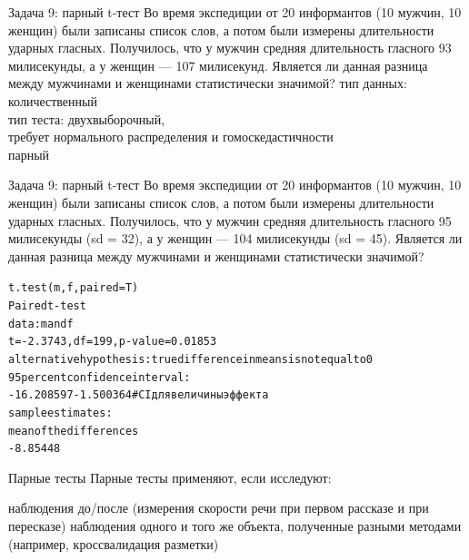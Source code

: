 \begin{frame}{Задача 9: парный t-тест}
Во время экспедиции от 20 информантов (10 мужчин, 10 женщин) были записаны список слов, а потом были измерены длительности ударных гласных. Получилось, что у мужчин средняя длительность гласного  93 милисекунды, а у женщин — 107 милисекунд. Является ли данная разница между мужчинами и женщинами статистически значимой?
\vfill
тип данных: количественный\\
тип теста: двухвыборочный,\\
требует нормального распределения и гомоскедастичности\\
парный
\end{frame}
\begin{frame}{Задача 9: парный t-тест}
Во время экспедиции от 20 информантов (10 мужчин, 10 женщин) были записаны список слов, а потом были измерены длительности ударных гласных. Получилось, что у мужчин средняя длительность гласного  95 милисекунды (sd = 32), а у женщин — 104 милисекунды (sd = 45). Является ли данная разница между мужчинами и женщинами статистически значимой?
\vfill
\scriptsize
\begin{alltt}
\alert{t.test(m, f, paired = T)}\medskip\\
Paired t-test\\
data:  m and f\\
\alert{t = -2.3743, df = 199, p-value = 0.01853}\\
alternative hypothesis: true difference in means is not equal to 0\\
95 percent confidence interval:\\
 -16.208597  -1.500364 \hfill \# CI для величины эффекта\\
sample estimates:\\
mean of the differences\\
-8.85448
\end{alltt}
\normalsize
\end{frame}
\begin{frame}{Парные тесты}
Парные тесты применяют, если исследуют:
\begin{itemize}
\mytem наблюдения до/после (измерения скорости речи при первом рассказе и при пересказе)
\mytem наблюдения одного и того же объекта, полученные разными методами (например, кроссвалидация разметки)
\end{itemize}
\end{frame}
